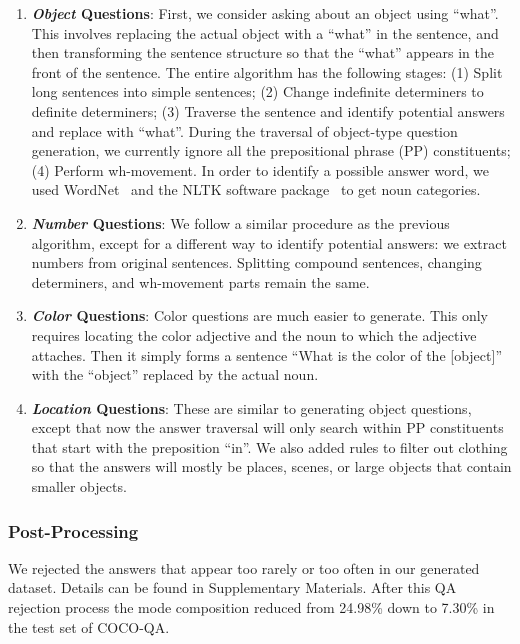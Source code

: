 \documentclass{article} %
\renewcommand{\#}[1]{\textbf{#1}}
\begin{document}
\begin{enumerate}[leftmargin=*]

\item \textbf{{\it Object} Questions}: First, we consider asking about an
object using ``what''. This involves replacing the actual object with a
``what'' in the sentence, and then transforming the sentence structure so that
the ``what'' appears in the front of the sentence. The entire algorithm has the
following stages: (1) Split long sentences into simple sentences; (2) Change
indefinite determiners to definite determiners; (3) Traverse the sentence and
identify potential answers and replace with ``what''. During the traversal of
object-type question generation, we currently ignore all the prepositional
phrase (PP) constituents; (4) Perform wh-movement. In order to identify a
possible answer word, we used WordNet~\cite{wordnet} and the NLTK software
package~\cite{nltk} to get noun categories.

\item \textbf{{\it Number} Questions}: We follow a similar procedure as the
previous algorithm, except for a different way to identify potential answers:
we extract numbers from original sentences. Splitting compound sentences,
changing determiners, and wh-movement parts remain the same.

\item \textbf{{\it Color} Questions}: Color questions are much easier to
generate. This only requires locating the color adjective and the noun to which
the adjective attaches. Then it simply forms a sentence ``What is the color of
the [object]'' with the ``object'' replaced by the actual noun.

\item \textbf{{\it Location} Questions}: These are similar to generating object
questions, except that now the answer traversal will only search within PP
constituents that start with the preposition ``in''. We also added rules to
filter out clothing so that the answers will mostly be places, scenes, or large
objects that contain smaller objects.

\end{enumerate}

\subsubsection{Post-Processing}

We rejected the answers that appear too rarely or too often in our generated
dataset. Details can be found in Supplementary Materials. After this QA
rejection process the mode composition reduced from 24.98\% down to 7.30\% in
the test set of COCO-QA.
\end{document}
